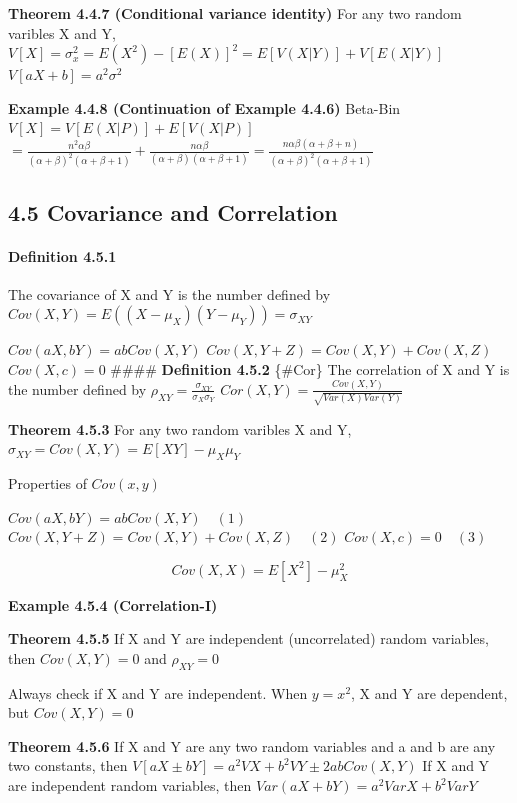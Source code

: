 \documentclass[6pt,twocolumn,Portrait]{article}
\let\oldparagraph\paragraph
\renewcommand{\paragraph}[1]{\oldparagraph{#1}\mbox{}}
\begin{document}
\textbf{Theorem 4.4.7 (Conditional variance identity)} For any two
random varibles X and Y,
\(V[X]=\sigma_{x}^2=E(X^2)-[E(X)]^2=E[V(X|Y)]+V[E(X|Y)]\)
\(V[aX+b]=a^2\sigma^2\)

\textbf{Example 4.4.8 (Continuation of Example 4.4.6)} Beta-Bin
\(V[X]=V[E(X|P)]+E[V(X|P)]\)
\(=\frac{n^2\alpha\beta}{(\alpha+\beta)^2(\alpha+\beta+1)}+\frac{n\alpha\beta}{(\alpha+\beta)(\alpha+\beta+1)}=\frac{n\alpha\beta(\alpha+\beta+n)}{(\alpha+\beta)^2(\alpha+\beta+1)}\)

\hypertarget{covariance-and-correlation}{%
\subsection{4.5 Covariance and
Correlation}\label{covariance-and-correlation}}

\hypertarget{Cov}{%
\paragraph{\texorpdfstring{\textbf{Definition
4.5.1}}{Definition 4.5.1}}\label{Cov}}

The covariance of X and Y is the number defined by
\(Cov(X,Y)=E((X-\mu_X)(Y-\mu_Y))=\sigma_{XY}\)

\(Cov(aX,bY)=abCov(X,Y)\) \(Cov(X,Y+Z)=Cov(X,Y)+Cov(X,Z)\)
\(Cov(X,c)=0\) \#\#\#\# \textbf{Definition 4.5.2} \{\#Cor\} The
correlation of X and Y is the number defined by
\(\rho_{XY}=\frac{\sigma_{XY}}{\sigma_X\sigma_Y}\)
\(Cor(X,Y)=\frac{Cov(X,Y)}{\sqrt{Var(X)Var(Y)}}\)

\textbf{Theorem 4.5.3} For any two random varibles X and Y,
\(\sigma_{XY}=Cov(X,Y)=E[XY]-\mu_X\mu_Y\)

Properties of \(Cov(x,y)\)

\(Cov(aX,bY)=abCov(X,Y)\quad (1)\)
\(Cov(X,Y+Z)=Cov(X,Y)+Cov(X,Z)\quad (2)\) \(Cov(X,c)=0\quad (3)\)

\[Cov(X,X)=E[X^2]-\mu_X^2\]

\textbf{Example 4.5.4 (Correlation-I)}

\textbf{Theorem 4.5.5} If X and Y are independent (uncorrelated) random
variables, then \(Cov(X,Y)=0\) and \(\rho_{XY}=0\)

Always check if X and Y are independent. When \(y=x^2\), X and Y are
dependent, but \(Cov(X,Y)=0\)

\textbf{Theorem 4.5.6} If X and Y are any two random variables and a and
b are any two constants, then \(V[aX\pm bY]=a^2VX+b^2VY\pm 2abCov(X,Y)\)
If X and Y are independent random variables, then
\(Var(aX+bY)=a^2VarX+b^2VarY\)
\end{document}
